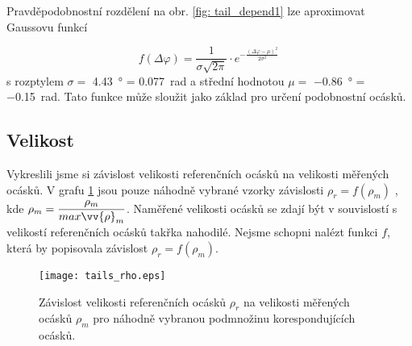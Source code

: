 Pravděpodobnostní rozdělení na obr. \ref{fig: tail_depend1} lze aproximovat Gaussovu funkcí

\begin{equation}
f(\Delta\varphi) = \frac{1}{\sigma\sqrt{2\pi}}\cdot e^{-\frac{\left(\Delta\varphi - \mu\right)^2}{2\sigma^2}}\, 
\end{equation}
s rozptylem $\sigma =  $ \SI{4.43}{\degree} = \SI{0.077}{\radian} a střední hodnotou $\mu = $ \SI{-0.86}{\degree} = \SI{-0.15}{\radian}. Tato funkce může sloužit jako základ pro určení podobnostní ocásků.   

\subsection{Velikost}
	Vykreslili jsme si závislost velikosti referenčních ocásků na velikosti měřených ocásků. V grafu \ref{fig: tail_depend2} jsou pouze náhodně vybrané vzorky závislosti $\rho_r = f(\rho_m)$  , kde $\rho_m = \dfrac{\rho_m}{max{\vv{\rho}_m}}$. Naměřené velikosti ocásků se zdají být v souvislostí s velikostí referenčních ocásků takřka nahodilé. Nejsme schopni nalézt funkci $f$, která by popisovala závislost $\rho_r = f(\rho_m)$.
	
	\begin{figure}[htps]
\centering
\texttt{[image: tails\_rho.eps]}
\caption{Závislost velikosti referenčních ocásků $\rho_r$ na velikosti měřených ocásků $\rho_m$ pro náhodně vybranou podmnožinu korespondujících ocásků.}
\label{fig: tail_depend2}
\end{figure}

\clearpage